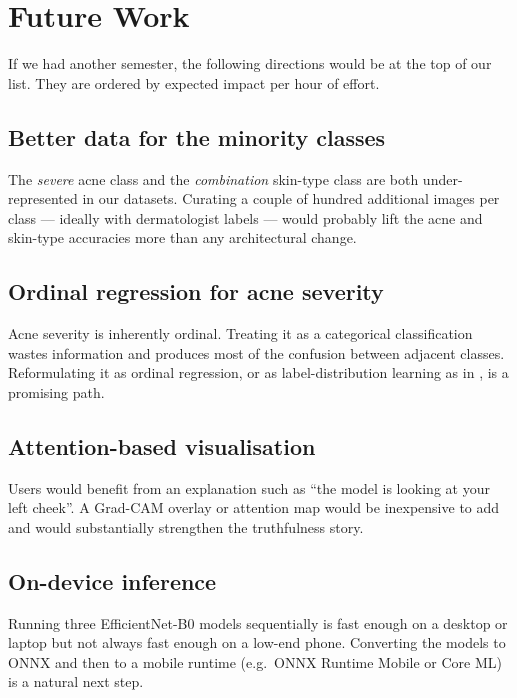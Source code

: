 \documentclass[11pt,a4paper,oneside]{report}
\newcommand{\effnet}{EfficientNet-B0\xspace}
\begin{document}
\chapter{Future Work}\label{ch:future}

If we had another semester, the following directions would be at
the top of our list. They are ordered by expected impact per hour
of effort.

\section{Better data for the minority classes}

The \emph{severe} acne class and the \emph{combination} skin-type
class are both under-represented in our datasets. Curating a
couple of hundred additional images per class --- ideally with
dermatologist labels --- would probably lift the acne and skin-type
accuracies more than any architectural change.

\section{Ordinal regression for acne severity}

Acne severity is inherently ordinal. Treating it as a categorical
classification wastes information and produces most of the confusion
between adjacent classes. Reformulating it as ordinal regression, or
as label-distribution learning as in \cite{wu2019acne04}, is a
promising path.

\section{Attention-based visualisation}

Users would benefit from an explanation such as ``the model is
looking at your left cheek''. A Grad-CAM overlay or attention map
would be inexpensive to add and would substantially strengthen
the truthfulness story.

\section{On-device inference}

Running three \effnet models sequentially is fast enough on a
desktop or laptop but not always fast enough on a low-end phone.
Converting the models to ONNX and then to a mobile runtime (e.g.\
ONNX Runtime Mobile or Core ML) is a natural next step.
\end{document}
